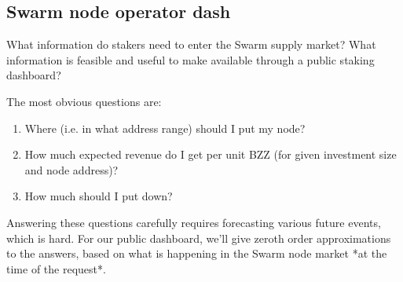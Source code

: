 \subsection*{Swarm node operator dash}

What information do stakers need to enter the Swarm supply market?
%
What information is feasible and useful to make available through a public staking dashboard?

The most obvious questions are:
\begin{enumerate}
\item Where (i.e. in what address range) should I put my node?
\item How much expected revenue do I get per unit BZZ (for given investment size and node address)?
\item How much should I put down?
\end{enumerate}

Answering these questions carefully requires forecasting various future events, which is hard. For our public dashboard, we'll give zeroth order approximations to the answers, based on what is happening in the Swarm node market *at the time of the request*.

